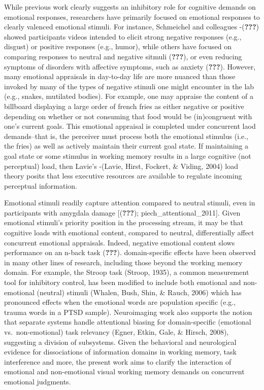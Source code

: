 \documentclass[man]{apa6}
\begin{document}
While previous work clearly suggests an inhibitory role for cognitive demands on emotional responses, researchers have primarily focused on emotional responses to clearly valenced emotional stimuli. For instance, Schmeichel and colleagues -({\textbf{???}}) showed participants videos intended to elicit strong negative responses (e.g., disgust) or positive responses (e.g., humor), while others have focused on comparing responses to neutral and negative sitmuli ({\textbf{???}}), or even reducing symptoms of disorders with affective symptoms, such as anxiety ({\textbf{???}}). However, many emotional appraisals in day-to-day life are more nuanced than those invoked by many of the types of negative stimuli one might encounter in the lab (e.g., snakes, mutilated bodies). For example, one may appraise the content of a billboard displaying a large order of french fries as either negative or positive depending on whether or not consuming that food would be (in)congruent with one's current goals. This emotional appraisal is completed under concurrent laod demands--that is, the perceiver must process both the emotional stimulus (i.e., the fries) as well as actively maintain their current goal state. If maintaining a goal state or some stimulus in working memory results in a large cognitive (not perceptual) load, then Lavie's -(Lavie, Hirst, Fockert, \& Viding, 2004) load theory posits that less executive resources are available to regulate incoming perceptual information.

Emotional stimuli readily capture attention compared to neutral stimuli, even in participants with amygdala damage {[}({\textbf{???}}); piech\_attentional\_2011{]}. Given emotional stimuli's priority position in the processing stream, it may be that cognitive loads with emotional content, compared to neutral, differentially affect concurrent emotional appraisals. Indeed, negative emotional content slows performance on an n-back task ({\textbf{???}}). domain-specific effects have been observed in many other lines of research, including those beyond the working memory domain. For example, the Stroop task (Stroop, 1935), a common measurement tool for inhibitory control, has been modified to include both emotional and non-emotional (neutral) stimuli (Whalen, Bush, Shin, \& Rauch, 2006) which has pronounced effects when the emotional words are population specific (e.g., trauma words in a PTSD sample). Neuroimaging work also supports the notion that separate systems handle attentional biasing for domain-specific (emotional vs.~non-emotional) task relevancy (Egner, Etkin, Gale, \& Hirsch, 2008), suggesting a division of subsystems. Given the behavioral and neurological evidence for dissociations of information domains in working memory, task interference and more, the present work aims to clarify the interaction of emotional and non-emotional visual working memory demands on concurrent emotional judgments.
\end{document}
